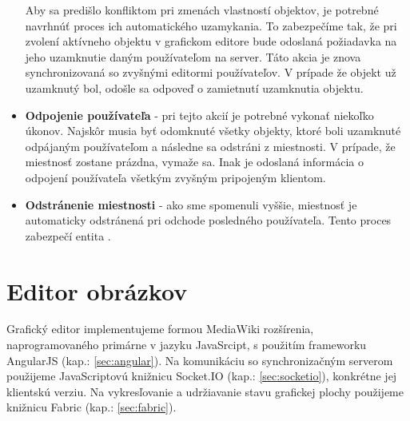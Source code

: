 \begin{itemize}
	Aby sa predišlo konfliktom pri zmenách vlastností objektov, je potrebné navrhnúť proces ich automatického uzamykania. To zabezpečíme tak, že pri zvolení aktívneho objektu v grafickom editore bude odoslaná požiadavka na jeho uzamknutie daným používateľom na server. Táto akcia je znova synchronizovaná so zvyšnými editormi používateľov. V prípade že objekt už uzamknutý bol, odošle sa odpoveď o zamietnutí uzamknutia objektu.
	
	\item \textbf{Odpojenie používateľa} - pri tejto akcií je potrebné vykonať niekoľko úkonov. Najskôr musia byť odomknuté všetky objekty, ktoré boli uzamknuté odpájaným používateľom a následne sa odstráni z miestnosti. V prípade, že miestnosť zostane prázdna, vymaže sa. Inak je odoslaná informácia o odpojení používateľa všetkým zvyšným pripojeným klientom.
	
	\item \textbf{Odstránenie miestnosti} - ako sme spomenuli vyššie, miestnosť je automaticky odstránená pri odchode posledného používateľa. Tento proces zabezpečí entita .
	
\end{itemize}

\section{Editor obrázkov}
Grafický editor implementujeme formou MediaWiki rozšírenia, naprogramovaného primárne v jazyku JavaSrcipt, s použitím frameworku AngularJS (kap.: \ref{sec:angular}). Na komunikáciu so synchronizačným serverom použijeme JavaScriptovú knižnicu Socket.IO (kap.: \ref{sec:socketio}), konkrétne jej klientskú verziu. Na vykresľovanie a udržiavanie stavu grafickej plochy použijeme knižnicu Fabric (kap.: \ref{sec:fabric}). 

